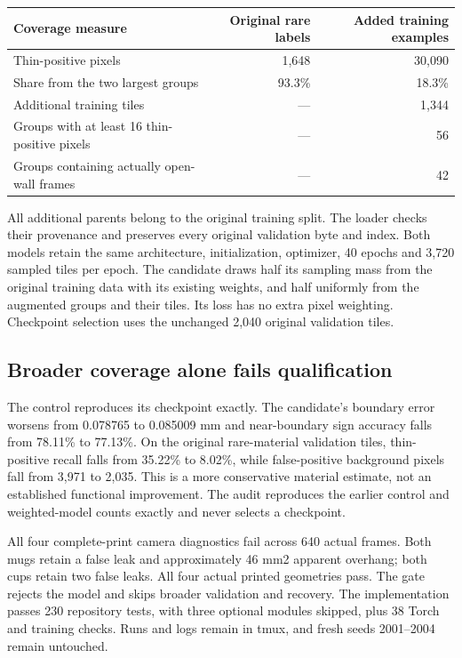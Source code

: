 \documentclass[10pt,letterpaper]{article}
\begin{document}
\begin{center}
\begin{tabular}{lrr}
\toprule
Coverage measure & Original rare labels & Added training examples\\
\midrule
Thin-positive pixels & 1,648 & 30,090\\
Share from the two largest groups & 93.3\% & 18.3\%\\
Additional training tiles & --- & 1,344\\
Groups with at least 16 thin-positive pixels & --- & 56\\
Groups containing actually open-wall frames & --- & 42\\
\bottomrule
\end{tabular}
\end{center}

All additional parents belong to the original training split. The loader checks
their provenance and preserves every original validation byte and index. Both
models retain the same architecture, initialization, optimizer, 40 epochs and
3,720 sampled tiles per epoch. The candidate draws half its sampling mass from
the original training data with its existing weights, and half uniformly from
the augmented groups and their tiles. Its loss has no extra pixel weighting.
Checkpoint selection uses the unchanged 2,040 original validation tiles.

\subsection*{Broader coverage alone fails qualification}
The control reproduces its checkpoint exactly. The candidate's boundary error
worsens from 0.078765 to 0.085009 mm and near-boundary sign accuracy falls from
78.11\% to 77.13\%. On the original rare-material validation tiles, thin-positive
recall falls from 35.22\% to 8.02\%, while false-positive background pixels fall
from 3,971 to 2,035. This is a more conservative material estimate, not an
established functional improvement. The audit reproduces the earlier control
and weighted-model counts exactly and never selects a checkpoint.

All four complete-print camera diagnostics fail across 640 actual frames.
Both mugs retain a false leak and approximately 46 mm2 apparent overhang;
both cups retain two false leaks. All four actual printed geometries pass.
The gate rejects the model and skips broader validation and recovery. The implementation passes
230 repository tests, with three optional modules skipped, plus 38 Torch and
training checks. Runs and logs remain in tmux, and fresh seeds 2001--2004 remain
untouched.
\end{document}
